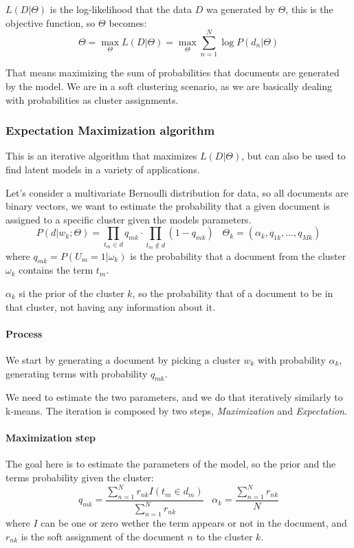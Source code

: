 $L(D | \Theta)$ is the log-likelihood that the data $D$ wa generated by $\Theta$, 
this is the objective function, so $\Theta$ becomes:
$$\Theta = \max_{\Theta} L(D|\Theta) = \max_\Theta\sum_{n=1}^N \log P(d_n | \Theta)$$

That means maximizing the sum of probabilities that documents are generated by 
the model. We are in a soft clustering scenario, as we are 
basically dealing with probabilities
as cluster assignments.

\subsubsection{Expectation Maximization algorithm}
This is an iterative algorithm that maximizes $L(D|\Theta)$, but can also be 
used to find latent models in a variety of applications.

Let's consider a multivariate Bernoulli distribution for data, 
so all documents are binary vectors, 
we want to estimate the probability that a given document is assigned to a
specific cluster given the models parameters.
$$P(d | w_k; \Theta) = \prod_{t_m \in d}q_{mk} 
\cdot \prod_{t_m \notin d}(1-q_{mk})\;\;\;\Theta_k = (\alpha_k, q_{1k}, \dots, q_{Mk})$$
where $q_{mk} = P(U_m =1 | \omega _k)$ is the probability that a document from the cluster 
$\omega_k$ contains the term $t_m$.

$\alpha_k$ si the prior of the cluster $k$, so the probability that of a document 
to be in that cluster, not having any information about it.

\paragraph{Process}
We start by generating a document by picking a cluster $w_k$ with probability 
$\alpha_k$, generating terms with probability $q_{mk}$. 

We need to estimate the two parameters, and we do that iteratively similarly to k-means.
The iteration is composed by two steps, \emph{Maximization} and \emph{Expectation}.

\paragraph{Maximization step}
The goal here is to estimate the parameters of the model, so the prior and the 
terms probability given the cluster:
$$q_{mk} = \frac{\sum_{n=1}^N r_{nk}I(t_m \in d_m)}{\sum_{n=1}^N r_{nk}}
\;\;\; \alpha_k = \frac{\sum_{n=1}^N r_{nk}}{N}$$
where $I$ can be one or zero wether the term appears or not in the 
document, and $r_{nk}$ is the soft assignment of the document $n$ to the 
cluster $k$.


